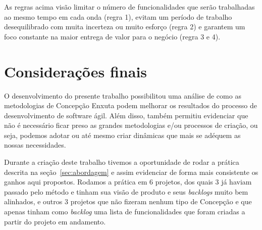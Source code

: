 \documentclass[10pt]{article}
\begin{document}
        	
        	As regras acima visão limitar o número de funcionalidades que serão trabalhadas ao mesmo tempo em cada onda (regra 1), evitam um período de trabalho desequilibrado com muita incerteza ou muito esforço (regra 2) e garantem um foco constante na maior entrega de valor para o negócio (regra 3 e 4).
            
\section{Considerações finais}\label{sec:consideracoes}

    O desenvolvimento do presente trabalho possibilitou uma análise de como as metodologias de Concepção Enxuta podem melhorar os resultados do processo de desenvolvimento de software ágil. Além disso, também permitiu evidenciar que não é necessário ficar preso as grandes metodologias e/ou processos de criação, ou seja, podemos adotar ou até mesmo criar dinâmicas que mais se adéquem as nossas necessidades.
    
    Durante a criação deste trabalho tivemos a oportunidade de rodar a prática descrita na seção~\ref{sec:abordagem} e assim evidenciar de forma mais consistente os ganhos aqui propostos. Rodamos a prática em 6 projetos, dos quais 3 já haviam passado pelo método \cite{Caroli:DiretoAoPonto} e tinham sua visão de produto e seus \textit{backlogs} muito bem alinhados, e outros 3 projetos que não fizeram nenhum tipo de Concepção e que apenas tinham como \textit{backlog} uma lista de funcionalidades que foram criadas a partir do projeto em andamento.
    
\end{document}

